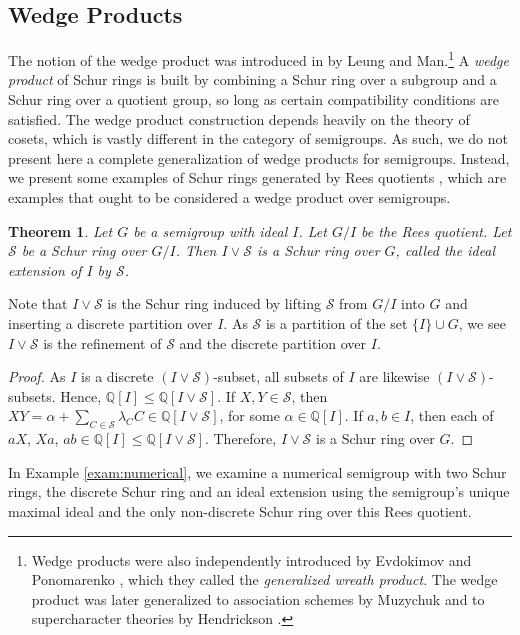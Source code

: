 \documentclass{article}
\theoremstyle{plain}
\newtheorem{Thm}{Theorem}[section]
\theoremstyle{definition}
\renewcommand{\S}{\mathcal{S}}
\newcommand{\Q}{\mathbb{Q}}
\begin{document}
\subsection{Wedge Products}
The notion of the wedge product was introduced in \cite{LeungI} by Leung and Man.\footnote{Wedge products were also independently introduced by Evdokimov and Ponomarenko \cite{Ponomarenko01, Ponomarenko02}, which they called the \emph{generalized wreath product}. The wedge product was later generalized to association schemes by Muzychuk \cite{MuzychukWedge} and to supercharacter theories by Hendrickson \cite{Hendrickson}.} A \emph{wedge product} of Schur rings is built by combining a Schur ring over a subgroup and a Schur ring over a quotient group, so long as certain compatibility conditions are satisfied.   The wedge product construction depends heavily on the theory of cosets, which is vastly different in the category of semigroups. As such, we do not present here a complete generalization of wedge products for semigroups. Instead, we present some examples of Schur rings generated by Rees quotients \cite{Rees}, which are examples that ought to be considered a wedge product over semigroups.

\begin{Thm}\label{thm:Reesextension} Let $G$ be a semigroup with ideal $I$. Let $G/I$ be the Rees quotient. Let $\S$ be a Schur ring over $G/I$. Then $I\vee \S$ %
 is a Schur ring over $G$, called the ideal extension of $I$ by $\S$.
\end{Thm}
Note that $I\vee \S$ is the Schur ring induced by lifting $\S$ from $G/I$ into $G$ and inserting a discrete partition over $I$. As $\S$ is a partition of the set $\{I\}\cup G$, we see $I\vee \S$ is the refinement of $\S$ and the discrete partition over $I$.
\begin{proof}
    As $I$ is a discrete $(I\vee \S)$-subset, all subsets of $I$ are likewise $(I\vee \S)$-subsets. Hence, $\Q[I]\le \Q[I\vee \S]$. If $X,Y\in \S$, then $XY = \alpha + \sum_{C\in \S} \lambda_CC \in \Q[I\vee \S]$, for some $\alpha\in \Q[I]$. If $a, b\in I$, then each of $aX$, $Xa$, $ab \in \Q[I] \le \Q[I\vee \S]$. Therefore, $I\vee \S$ is a Schur ring over $G$.
\end{proof}

In Example \ref{exam:numerical}, we examine a numerical semigroup with two Schur rings, the discrete Schur ring and an ideal extension using the semigroup's unique maximal ideal and the only non-discrete Schur ring over this Rees quotient.
\end{document}
